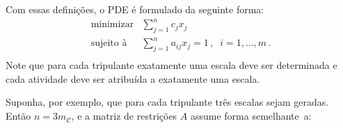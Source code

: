 \documentclass[12pt,a4paper]{article}
\newcommand{\ep}{\, .}                                       %
\newcommand{\calC}{\mathcal{C}}
\begin{document}
Com essas definições, o PDE é formulado da seguinte forma:
%
\begin{equation} \label{eq:sppe}
	\begin{array}{rl}
		\text{minimizar} & \displaystyle \sum_{j=1}^n c_j x_j \\
		\text{sujeito à} & \displaystyle \sum_{j=1}^n a_{ij} x_j = 1 \, , \;\; i = 1, \ldots, m \ep \\
	\end{array}
\end{equation}
%
Note que para cada tripulante exatamente uma escala deve ser determinada e cada atividade deve ser
atribuída a exatamente uma escala.

Suponha, por exemplo, que para cada tripulante três escalas sejam geradas. Então $n = 3m_\calC$, 
e a matriz de restrições $A$ assume forma semelhante~a:
\end{document}
